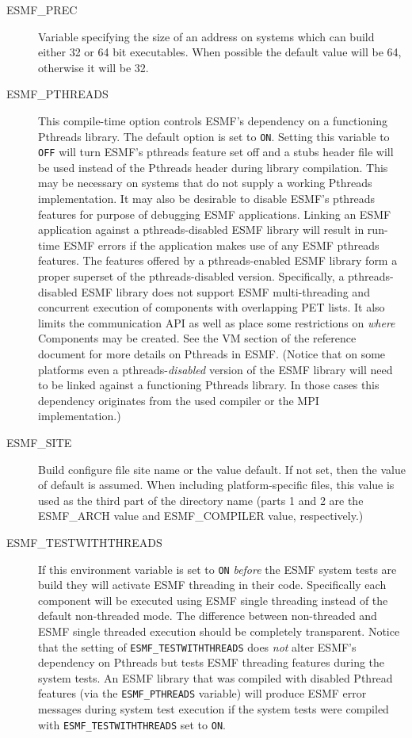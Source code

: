 \begin{description}
\item[ESMF\_PREC] 

Variable specifying the size of an address on systems which can build
either 32 or 64 bit executables.  When possible the default value will be
64, otherwise it will be 32.

\item[ESMF\_PTHREADS]

This compile-time option controls ESMF's dependency on a functioning
Pthreads library. The default option is set to {\tt ON}. Setting this
variable to {\tt OFF} will turn ESMF's pthreads feature set off and a
stubs header file will be used instead of the Pthreads header during
library compilation. This may be necessary on systems that do not
supply a working Pthreads implementation. It may also be desirable to
disable ESMF's pthreads features for purpose of debugging ESMF
applications. Linking an ESMF application against a pthreads-disabled
ESMF library will result in run-time ESMF errors if the application
makes use of any ESMF pthreads features. The features offered by a
pthreads-enabled ESMF library form a proper superset of the
pthreads-disabled version. Specifically, a pthreads-disabled ESMF
library does not support ESMF multi-threading and concurrent execution
of components with overlapping PET lists. It also limits the
communication API as well as place some restrictions on {\em where}
Components may be created. See the VM section of the reference
document for more details on Pthreads in ESMF. (Notice that on some
platforms even a pthreads-{\em disabled} version of the ESMF library
will need to be linked against a functioning Pthreads library. In
those cases this dependency originates from the used compiler or the
MPI implementation.)

\item[ESMF\_SITE] 
Build configure file site name or the value default.  
If not set, then the value of default is assumed.
When including platform-specific files, this value is used as the
third part of the directory name (parts 1 and 2 are the
ESMF\_ARCH value and ESMF\_COMPILER value, respectively.)

\item[ESMF\_TESTWITHTHREADS]

If this environment variable is set to {\tt ON} {\em before} the ESMF system tests are build they will activate ESMF threading in their code. Specifically each component will be executed using ESMF single threading instead of the default non-threaded mode. The difference between non-threaded and ESMF single threaded execution should be completely transparent. Notice that the setting of {\tt ESMF\_TESTWITHTHREADS} does {\em not} alter ESMF's dependency on Pthreads but tests ESMF threading features during the system tests. An ESMF library that was compiled with disabled Pthread features (via the {\tt ESMF\_PTHREADS} variable) will produce ESMF error messages during system test execution if the system tests were compiled with {\tt ESMF\_TESTWITHTHREADS} set to {\tt ON}.

\end{description}


